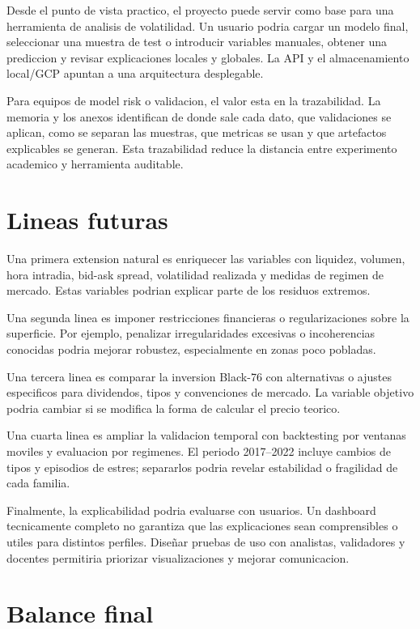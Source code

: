 Desde el punto de vista practico, el proyecto puede servir como base para una herramienta de analisis de volatilidad. Un usuario podria cargar un modelo final, seleccionar una muestra de test o introducir variables manuales, obtener una prediccion y revisar explicaciones locales y globales. La API y el almacenamiento local/GCP apuntan a una arquitectura desplegable.

Para equipos de model risk o validacion, el valor esta en la trazabilidad. La memoria y los anexos identifican de donde sale cada dato, que validaciones se aplican, como se separan las muestras, que metricas se usan y que artefactos explicables se generan. Esta trazabilidad reduce la distancia entre experimento academico y herramienta auditable.

\section{Lineas futuras}

Una primera extension natural es enriquecer las variables con liquidez, volumen, hora intradia, bid-ask spread, volatilidad realizada y medidas de regimen de mercado. Estas variables podrian explicar parte de los residuos extremos.

Una segunda linea es imponer restricciones financieras o regularizaciones sobre la superficie. Por ejemplo, penalizar irregularidades excesivas o incoherencias conocidas podria mejorar robustez, especialmente en zonas poco pobladas.

Una tercera linea es comparar la inversion Black-76 con alternativas o ajustes especificos para dividendos, tipos y convenciones de mercado. La variable objetivo podria cambiar si se modifica la forma de calcular el precio teorico.

Una cuarta linea es ampliar la validacion temporal con backtesting por ventanas moviles y evaluacion por regimenes. El periodo 2017--2022 incluye cambios de tipos y episodios de estres; separarlos podria revelar estabilidad o fragilidad de cada familia.

Finalmente, la explicabilidad podria evaluarse con usuarios. Un dashboard tecnicamente completo no garantiza que las explicaciones sean comprensibles o utiles para distintos perfiles. Diseñar pruebas de uso con analistas, validadores y docentes permitiria priorizar visualizaciones y mejorar comunicacion.

\section{Balance final}

